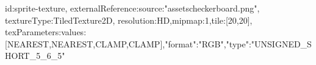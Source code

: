 {id:sprite-texture,
externalReference:{source:"assets\/checkerboard.png"},
textureType:TiledTexture2D,
resolution:HD,mipmap:1,tile:[20,20],
texParameters:{values:[NEAREST,NEAREST,CLAMP,CLAMP]},"format":"RGB","type":"UNSIGNED_SHORT_5_6_5"}